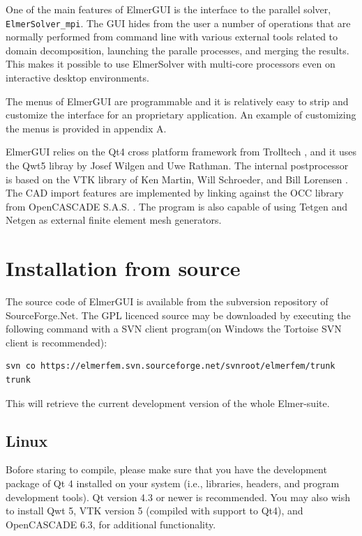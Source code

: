 \documentclass[a4paper,12pt]{article}
\begin{document}
One of the main features of ElmerGUI is the interface to the parallel solver,  {\tt ElmerSolver\_mpi}.
The GUI hides from the user a number of operations that are normally performed from command line with various external tools related to domain decomposition, launching the paralle processes, and merging the results. This makes it possible to use ElmerSolver with multi-core processors even on interactive desktop
environments.

The menus of ElmerGUI are programmable and it is relatively easy to strip and customize the interface
for an proprietary application. An example of customizing the menus is provided in appendix A.

ElmerGUI relies on the Qt4 cross platform framework from Trolltech \cite{QtHome}, and it uses the Qwt5
libray by Josef Wilgen and Uwe Rathman\cite{QwtHome}. The internal postprocessor is based on the VTK  library of Ken Martin, Will Schroeder, and Bill Lorensen \cite{VTKHome}. The CAD import features are
implemented by linking against the OCC library from OpenCASCADE S.A.S. \cite{OCCHome}. The program is
also capable of using Tetgen \cite{TetgenHome} and Netgen \cite{NetgenHome} as external finite element
mesh generators.

\section{Installation from source}

The source code of ElmerGUI is available from the subversion repository of SourceForge.Net. The GPL
licenced source may be downloaded by executing the following command with a SVN client program(on
Windows the Tortoise SVN client is recommended):

\begin{footnotesize}
\begin{verbatim}
svn co https://elmerfem.svn.sourceforge.net/svnroot/elmerfem/trunk trunk
\end{verbatim}
\end{footnotesize}
\noindent This will retrieve the current development version of the whole Elmer-suite.

\subsection{Linux}

Bofore staring to compile, please make sure that you have the development package of Qt 4
installed on your system (i.e., libraries, headers, and program development tools). Qt version 4.3
or newer is recommended. You may also wish to install Qwt 5, VTK version 5 (compiled with support to Qt4), and OpenCASCADE 6.3, for additional functionality.
\end{document}
